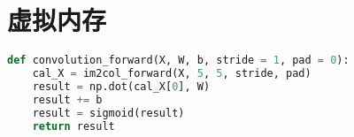 
\section{虚拟内存}

\begin{lstlisting}[language=Python, caption={这里是代码标题}, label={code:a-label-to-be-refered-to}]
def convolution_forward(X, W, b, stride = 1, pad = 0):
    cal_X = im2col_forward(X, 5, 5, stride, pad)
    result = np.dot(cal_X[0], W)
    result += b
    result = sigmoid(result)
    return result
\end{lstlisting}
